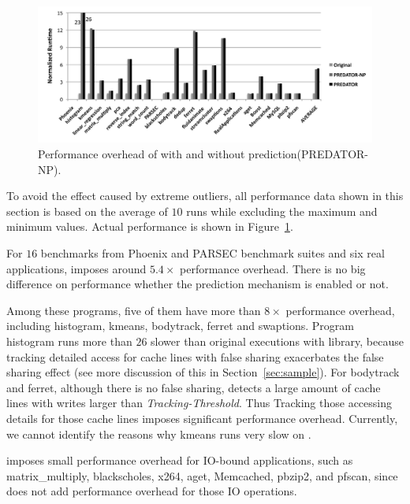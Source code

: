 \begin{figure}[ht]
\begin{center}
\includegraphics[width=6.5in]{fig/perf}
\end{center}
\caption{
Performance overhead of \Predator{} with and without prediction(PREDATOR-NP).
\label{fig:perf}}
\end{figure}

To avoid the effect caused by extreme outliers, all performance data shown in this section
is based on the average of $10$ runs while excluding the maximum and minimum values. Actual performance is shown in Figure~\ref{fig:perf}. 

For $16$ benchmarks from Phoenix and PARSEC benchmark suites and six real applications,  \Predator{} imposes around $5.4\times$ performance overhead. There is no big difference on performance whether the prediction mechanism is enabled or not. 
 
Among these programs, five of them have more than $8\times$ performance overhead, including histogram, kmeans, bodytrack, ferret and swaptions. 
Program histogram runs more than $26$ slower than original executions with \pthreads{} library, because tracking detailed access for cache lines with false sharing exacerbates the false sharing effect (see more discussion of this in Section~\ref{sec:sample}).  For bodytrack and ferret, although there is no false sharing, \Predator{} detects a large amount of cache lines with writes larger than {\it Tracking-Threshold}.  Thus Tracking those accessing details for those cache lines imposes significant performance overhead. Currently, we cannot identify the reasons why kmeans runs very slow on \Predator{}.
   
\Predator{} imposes small performance overhead for IO-bound applications, such as matrix\_multiply, blackscholes, x264, aget, Memcached, pbzip2, and pfscan, since \Predator{} does not add performance overhead for those IO operations.  

